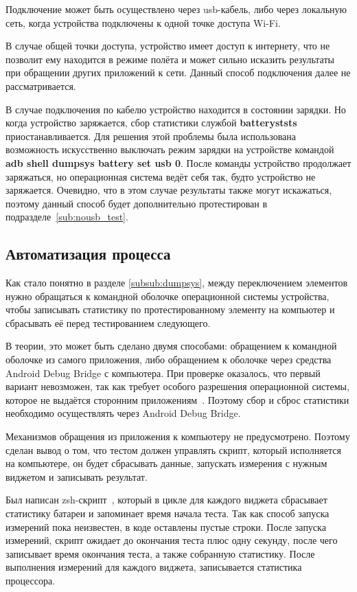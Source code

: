 \documentclass[a4paper,14pt]{extarticle} %
\begin{document}
	Подключение может быть осуществлено через usb-кабель, либо через локальную сеть, когда устройства подключены к одной точке доступа Wi-Fi.
	
	В случае общей точки доступа, устройство имеет доступ к интернету, что не позволит ему находится в режиме полёта и может сильно исказить результаты при обращении других приложений к сети. Данный способ подключения далее не рассматривается.
	
	В случае подключения по кабелю устройство находится в состоянии зарядки. Но когда устройство заряжается, сбор статистики службой \textbf{batteryststs} приостанавливается. Для решения этой проблемы была использована возможность искусственно выключать режим зарядки на устройстве командой \textbf{adb shell dumpsys battery set usb 0}. После команды устройство продолжает заряжаться, но операционная система ведёт себя так, будто устройство не заряжается. Очевидно, что в этом случае результаты также могут искажаться, поэтому данный способ будет дополнительно протестирован в подразделе~\ref{sub:nousb_test}.
	
	\subsection{Автоматизация процесса}
	
	Как стало понятно в разделе \ref{subsub:dumpsys}, между переключением элементов нужно обращаться к командной оболочке операционной системы устройства, чтобы записывать статистику по протестированному элементу на компьютер и сбрасывать её перед тестированием следующего.
	
	В теории, это может быть сделано двумя способами: обращением к командной оболочке из самого приложения, либо обращением к оболочке через средства Android Debug Bridge с компьютера. При проверке оказалось, что первый вариант невозможен, так как требует особого разрешения операционной системы, которое не выдаётся сторонним приложениям~\parencite{Dump_Permission}. Поэтому сбор и сброс статистики необходимо осуществлять через Android Debug Bridge. 
	
	Механизмов обращения из приложения к компьютеру не предусмотрено. Поэтому сделан вывод о том, что тестом должен управлять скрипт, который исполняется на компьютере, он будет сбрасывать данные, запускать измерения с нужным виджетом и записывать результат.
	
	Был написан zsh-скрипт~\ris{\ref{fig:estimation}}, который в цикле для каждого виджета сбрасывает статистику батареи и запоминает время начала теста. Так как способ запуска измерений пока неизвестен, в коде оставлены пустые строки. После запуска измерений, скрипт ожидает до окончания теста плюс одну секунду, после чего записывает время окончания теста, а также собранную статистику. После выполнения измерений для каждого виджета, записывается статистика процессора.
	
\end{document}
